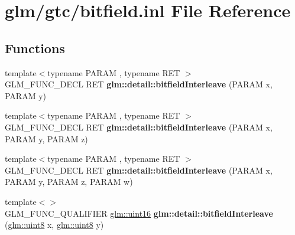 \hypertarget{bitfield_8inl}{\section{glm/gtc/bitfield.inl File Reference}
\label{bitfield_8inl}
}
\subsection*{Functions}
\begin{DoxyCompactItemize}
\item 
\hypertarget{namespaceglm_1_1detail_a39644ee418ae41e3393d1cb6191e32a7}{{\footnotesize template$<$typename P\-A\-R\-A\-M , typename R\-E\-T $>$ }\\G\-L\-M\-\_\-\-F\-U\-N\-C\-\_\-\-D\-E\-C\-L R\-E\-T {\bfseries glm\-::detail\-::bitfield\-Interleave} (P\-A\-R\-A\-M x, P\-A\-R\-A\-M y)}\label{namespaceglm_1_1detail_a39644ee418ae41e3393d1cb6191e32a7}

\item 
\hypertarget{namespaceglm_1_1detail_aa2fdd8f720417a13990873ba704a3426}{{\footnotesize template$<$typename P\-A\-R\-A\-M , typename R\-E\-T $>$ }\\G\-L\-M\-\_\-\-F\-U\-N\-C\-\_\-\-D\-E\-C\-L R\-E\-T {\bfseries glm\-::detail\-::bitfield\-Interleave} (P\-A\-R\-A\-M x, P\-A\-R\-A\-M y, P\-A\-R\-A\-M z)}\label{namespaceglm_1_1detail_aa2fdd8f720417a13990873ba704a3426}

\item 
\hypertarget{namespaceglm_1_1detail_a606f6dc8c8314159fafef68f820c2c65}{{\footnotesize template$<$typename P\-A\-R\-A\-M , typename R\-E\-T $>$ }\\G\-L\-M\-\_\-\-F\-U\-N\-C\-\_\-\-D\-E\-C\-L R\-E\-T {\bfseries glm\-::detail\-::bitfield\-Interleave} (P\-A\-R\-A\-M x, P\-A\-R\-A\-M y, P\-A\-R\-A\-M z, P\-A\-R\-A\-M w)}\label{namespaceglm_1_1detail_a606f6dc8c8314159fafef68f820c2c65}

\item 
\hypertarget{namespaceglm_1_1detail_ac59c574dc7900d87786f5a96f82ea6e7}{{\footnotesize template$<$$>$ }\\G\-L\-M\-\_\-\-F\-U\-N\-C\-\_\-\-Q\-U\-A\-L\-I\-F\-I\-E\-R \hyperlink{group__gtc__type__precision_gad8c2939e1fdd8e5828b31d95c52255d5}{glm\-::uint16} {\bfseries glm\-::detail\-::bitfield\-Interleave} (\hyperlink{group__gtc__type__precision_ga1a7dcd8aac97cc8020817c94049deff2}{glm\-::uint8} x, \hyperlink{group__gtc__type__precision_ga1a7dcd8aac97cc8020817c94049deff2}{glm\-::uint8} y)}\label{namespaceglm_1_1detail_ac59c574dc7900d87786f5a96f82ea6e7}


\end{DoxyCompactItemize}

